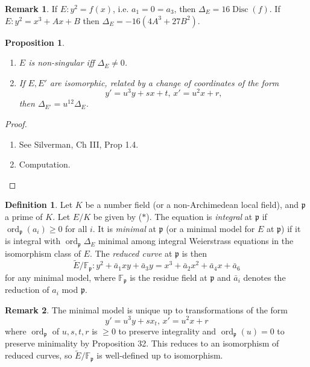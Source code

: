 \documentclass[a4paper]{article}
\newtheorem{proposition}[theorem]{Proposition}
\theoremstyle{definition}
\newtheorem*{definition}{Definition}
\newtheorem*{remark}{Remark}
\DeclareMathOperator{\Disc}{Disc}
\DeclareMathOperator{\ord}{ord}
\newcommand{\p}{\mathfrak{p}}
\newcommand{\F}{\mathbb{F}}
\begin{document}
\begin{remark}
    If $E:y^2=f(x)$, i.e. $a_1=0=a_3$, then $\Delta_E=16\Disc(f)$. If
    $E:y^2=x^3+Ax+B$ then $\Delta_E=-16(4A^3+27B^2)$.
\end{remark}

\begin{proposition}
    \begin{enumerate}[label=(\roman*)]
        \item $E$ is non-singular iff $\Delta_E\ne0$.
        \item If $E,E'$ are isomorphic, related by a change of coordinates of
            the form
            \begin{equation*}
                y'=u^3y+sx+t,\,x'=u^2x+r,
            \end{equation*}
            then $\Delta_{E'}=u^{12}\Delta_E$.
    \end{enumerate}
\end{proposition}

\begin{proof}
    \begin{enumerate}[label=(\roman*)]
        \item See Silverman, Ch III, Prop 1.4.
        \item Computation.
    \end{enumerate}
\end{proof}

\begin{definition}
    Let $K$ be a number field (or a non-Archimedean local field), and $\p$ a
    prime of $K$. Let $E/K$ be given by ($*$). The equation is \emph{integral}
    at $\p$ if $\ord_\p(a_i)\ge0$ for all $i$. It is \emph{minimal} at $\p$ (or
    a minimal model for $E$ at $\p$) if it is integral with $\ord_\p\Delta_E$
    minimal among integral Weierstrass equations in the isomorphism class of
    $E$. The \emph{reduced curve} at $\p$ is then
    \begin{equation*}
        \tilde E/\F_\p : y^2 + \bar a_1xy + \bar a_3y
            = x^3 + \bar a_2x^2 + \bar a_4x + \bar a_6
    \end{equation*}
    for any minimal model, where $\F_\p$ is the residue field at $\p$ and
    $\bar a_i$ denotes the reduction of $a_i$ mod $\p$.
\end{definition}

\begin{remark}
    The minimal model is unique up to transformations of the form
    \begin{equation*}
        y'=u^3y+sx_t,\,x'=u^2x+r
    \end{equation*}
    where $\ord_\p$ of $u,s,t,r$ is $\ge0$ to preserve integrality and
    $\ord_\p(u)=0$ to preserve minimality by Proposition 32. This reduces to an
    isomorphism of reduced curves, so $\tilde E/\F_\p$ is well-defined up to
    isomorphism.
\end{remark}
\end{document}
